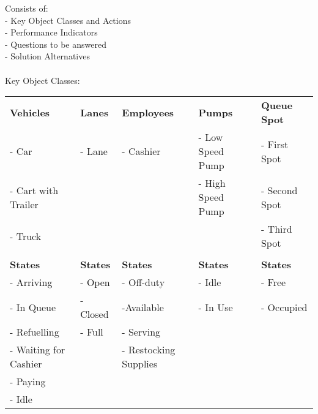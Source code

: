 Consists of:\\
- Key Object Classes and Actions\\
- Performance Indicators\\
- Questions to be answered\\
- Solution Alternatives \\
\\
Key Object Classes:
\begin{center}
\begin{tabular}{| l | l | l | l | l |}
\hline
\textbf{Vehicles} & \textbf{Lanes} & \textbf{Employees} & \textbf{Pumps} & \textbf{Queue Spot}\\
- Car & - Lane & - Cashier& - Low Speed Pump & - First Spot\\
- Cart with Trailer & & & - High Speed Pump & - Second Spot\\
- Truck & & & & - Third Spot\\
& & & & \\
\textbf{States} & \textbf{States} & \textbf{States} & \textbf{States} & \textbf{States}\\
- Arriving & - Open & - Off-duty & - Idle & - Free\\
- In Queue & - Closed & -Available & - In Use & - Occupied\\
- Refuelling & - Full & - Serving & &\\
- Waiting for Cashier & & - Restocking Supplies & &\\
- Paying & & & &\\
- Idle & & & &\\
\hline
\end{tabular}
\end{center}